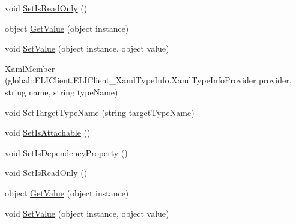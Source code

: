 \begin{DoxyCompactItemize}
\item 
void \hyperlink{class_e_l_i_client_1_1_e_l_i_client___xaml_type_info_1_1_xaml_member_a4bbc6299976d7ece81eb280f524ee88e}{Set\+Is\+Read\+Only} ()
\item 
object \hyperlink{class_e_l_i_client_1_1_e_l_i_client___xaml_type_info_1_1_xaml_member_a8746f4f3591a5a6568efb4868a0d507a}{Get\+Value} (object instance)
\item 
void \hyperlink{class_e_l_i_client_1_1_e_l_i_client___xaml_type_info_1_1_xaml_member_a8a245ec3f4d3098faae8d6f261976340}{Set\+Value} (object instance, object value)
\item 
\hyperlink{class_e_l_i_client_1_1_e_l_i_client___xaml_type_info_1_1_xaml_member_a459e15df1bb2f1db7eb674875071d4ed}{Xaml\+Member} (global\+::\+E\+L\+I\+Client.\+E\+L\+I\+Client\+\_\+\+Xaml\+Type\+Info.\+Xaml\+Type\+Info\+Provider provider, string name, string type\+Name)
\item 
void \hyperlink{class_e_l_i_client_1_1_e_l_i_client___xaml_type_info_1_1_xaml_member_ab5cc2f3b78450d6b605fd3f0dee70c72}{Set\+Target\+Type\+Name} (string target\+Type\+Name)
\item 
void \hyperlink{class_e_l_i_client_1_1_e_l_i_client___xaml_type_info_1_1_xaml_member_affffe9d411b19464941a2032368c9709}{Set\+Is\+Attachable} ()
\item 
void \hyperlink{class_e_l_i_client_1_1_e_l_i_client___xaml_type_info_1_1_xaml_member_a6975f96aa6cb1f35ac539043b00635f6}{Set\+Is\+Dependency\+Property} ()
\item 
void \hyperlink{class_e_l_i_client_1_1_e_l_i_client___xaml_type_info_1_1_xaml_member_a4bbc6299976d7ece81eb280f524ee88e}{Set\+Is\+Read\+Only} ()
\item 
object \hyperlink{class_e_l_i_client_1_1_e_l_i_client___xaml_type_info_1_1_xaml_member_a8746f4f3591a5a6568efb4868a0d507a}{Get\+Value} (object instance)
\item 
void \hyperlink{class_e_l_i_client_1_1_e_l_i_client___xaml_type_info_1_1_xaml_member_a8a245ec3f4d3098faae8d6f261976340}{Set\+Value} (object instance, object value)
\end{DoxyCompactItemize}
